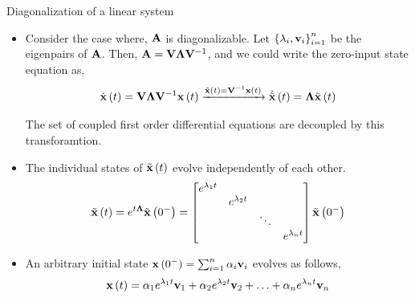 \documentclass[aspectratio=169]{beamer}
\def\mf{\ensuremath\mathbf}
\def\lp{\ensuremath\left(}
\def\rp{\ensuremath\right)}
\def\lc{\ensuremath\left\{}
\def\rc{\ensuremath\right\}}
\def\bmx{\ensuremath\begin{bmatrix*}[r]}
\def\emx{\ensuremath\end{bmatrix*}}
\newcommand{\ct}[1]{\lp #1\rp}
\begin{document}
\begin{frame}{Diagonalization of a linear system}
\begin{small}
\begin{itemize}
    \item Consider the case where, $\mf{A}$ is diagonalizable. Let $\lc\lambda_i, \mf{v}_i\rc_{i=1}^n$ be the eigenpairs of $\mf{A}$. Then, $\mf{A} = \mf{V}\mf{\Lambda}\mf{V}^{-1}$, and we could write the zero-input state equation as,
    \[ \dot{\mf{x}}\ct{t} = \mf{V}\mf{\Lambda}\mf{V}^{-1}\mf{x}\ct{t} \xrightarrow[]{\tilde{\mf{x}}\ct{t} = \mf{V}^{-1}\mf{x}\ct{t}} \dot{\tilde{\mf{x}}}\ct{t} = \mf{\Lambda}\tilde{\mf{x}}\ct{t} \]

    The set of coupled first order differential equations are decoupled by this transforamtion.

    \item The individual states of $\tilde{\mf{x}}\ct{t}$ evolve independently of each other.
    $$\tilde{\mf{x}}\ct{t} = e^{t\mf{\Lambda}}\tilde{\mf{x}}\ct{0^-} = \bmx 
    e^{\lambda_1 t} & & & \\
     & e^{\lambda_2 t} & & \\
     & & \ddots & \\
     & & & e^{\lambda_n t}
    \emx \tilde{\mf{x}}\ct{0^-}$$

    \item An arbitrary initial state $\mf{x}\ct{0^-} = \sum_{i=1}^{n}\alpha_i\mf{v}_i$ evolves as follows,
    \[ \mf{x}\ct{t} = \alpha_1e^{\lambda_1t}\mf{v}_1 + \alpha_2e^{\lambda_2t}\mf{v}_2 + \ldots + \alpha_ne^{\lambda_nt}\mf{v}_n\]
\end{itemize}
\end{small}
\end{frame}
\end{document}
